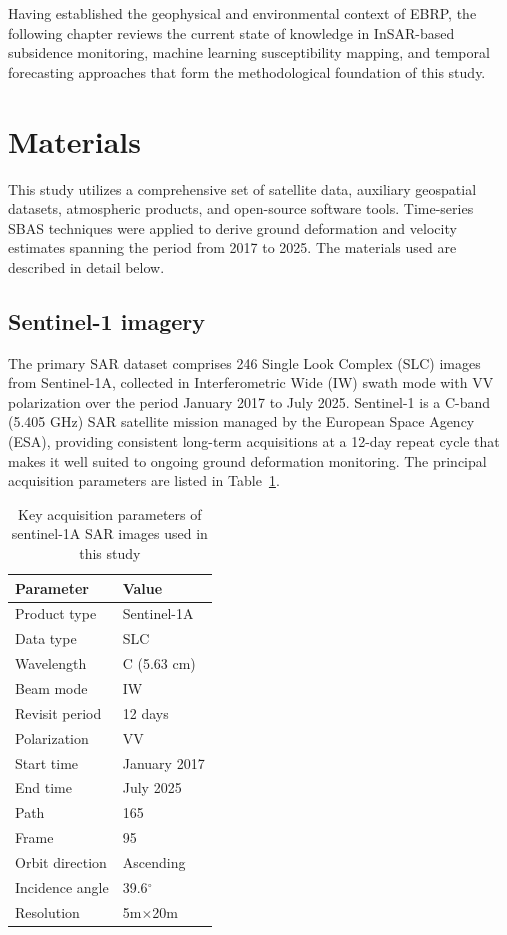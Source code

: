 \documentclass[oneside,doublespacing,flushright]{lsuthesis}
\begin{document}
Having established the geophysical and environmental context of EBRP, the following chapter reviews the current state of knowledge in InSAR-based subsidence monitoring, machine learning susceptibility mapping, and temporal forecasting approaches that 
form the methodological foundation of this study.

\section{Materials}
This study utilizes a comprehensive set of satellite data, auxiliary geospatial datasets,
atmospheric products, and open-source software tools. Time-series SBAS techniques were applied to derive ground 
deformation and velocity estimates spanning the period from 2017 to 2025.
The materials used are described in detail below.
\subsection{Sentinel-1 imagery}
The primary SAR dataset comprises 246 Single Look Complex (SLC) images from Sentinel-1A, collected in Interferometric Wide (IW) swath mode with VV polarization over the period January 2017 to July 2025. Sentinel-1 is a C-band (5.405 GHz) SAR satellite mission managed by the European Space Agency (ESA), providing consistent long-term acquisitions at a 12-day repeat cycle that makes it well suited to ongoing ground deformation monitoring. The principal acquisition parameters are listed in Table~\ref{tab:sar_parameters}.

\begin{table}[!t]
\centering
\caption{Key acquisition parameters of sentinel-1A SAR images used in this study}
\label{tab:sar_parameters}
\begin{tabular}{ll}
\hline
\textbf{Parameter} & \textbf{Value} \\
\hline
Product type & Sentinel-1A \\
Data type & SLC \\
Wavelength & C (5.63 cm) \\
Beam mode & IW \\
Revisit period & 12 days \\
Polarization & VV \\
Start time & January 2017 \\
End time & July 2025 \\
Path & 165 \\
Frame & 95 \\
Orbit direction & Ascending \\
Incidence angle & 39.6$^\circ$ \\
Resolution & 5m$\times$20m \\
\hline
\end{tabular}
\end{table}
\end{document}
